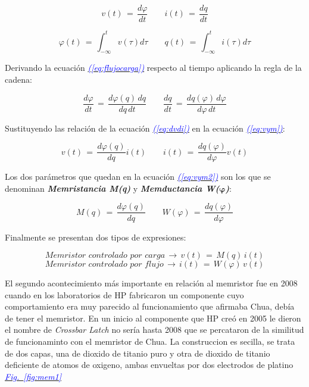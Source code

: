 \documentclass[12pt,a4paper]{report} %
\newcommand{\fref}[1]{\hyperref[#1]{\textcolor{blue}{\textit{Fig.~\ref*{#1}}}}}
\newcommand{\eref}[1]{\hyperref[#1]{\textcolor{blue}{\textit{(\ref*{#1})}}}}
\begin{document}
	\begin{equation}
		v(t)\,=\,\frac{d\varphi}{dt} \qquad i(t)\,=\,\frac{dq}{dt}
		\label{eq:dvdi}
	\end{equation}
			
	\begin{equation}
		\varphi(t)\,=\,\int_{-\infty}^{t}v(\tau)d\tau \qquad q(t)\,=\,\int_{-\infty}^{t}i(\tau)d\tau
		\label{eq:flujocargaintegral}
	\end{equation}\smallskip
	
	Derivando la ecuación \eref{eq:flujocarga} respecto al tiempo aplicando la regla de la cadena:
	
	\begin{equation}
		\frac{d\varphi}{dt}\,=\,\frac{d\varphi(q)\,dq}{dq\,dt} \qquad \frac{dq}{dt}\,=\,\frac{dq(\varphi)\,d\varphi}{d\varphi\,dt}
		\label{eq:vym}
	\end{equation}\smallskip
	
	Sustituyendo las relación de la ecuación \eref{eq:dvdi} en la ecuación \eref{eq:vym}:
	
	\begin{equation}
		v(t)\,=\,\frac{d\varphi(q)}{dq}i(t) \qquad i(t)\,=\,\frac{dq(\varphi)}{d\varphi}v(t)
		\label{eq:vym2}
	\end{equation}\smallskip
	
	Los dos parámetros que quedan en la ecuación \eref{eq:vym2} son los que se denominan \textbf{\textit{Memristancia M(q)}} y \textbf{\textit{Memductancia W($\bm{\varphi}$)}}: 
	
	\begin{equation}
		M(q)\,=\,\frac{d\varphi(q)}{dq} \qquad W(\varphi)\,=\,\frac{dq(\varphi)}{d\varphi}
		\label{eq:myw}
	\end{equation}\smallskip
	
	Finalmente se presentan dos tipos de expresiones:
	
	\begin{equation}
		\textit{Memristor controlado por carga} \, \rightarrow \, v(t)\,=\,M(q)\,i(t)
		\label{eq:cc}
	\end{equation}\smallskip
	\begin{equation}
		\textit{Memristor controlado por flujo} \, \rightarrow \, i(t)\,=\,W(\varphi)\,v(t)
		\label{eq:fc}
	\end{equation}\smallskip

	
	
	\newpage
	
	El segundo acontecimiento más importante en relación al memristor fue en 2008 cuando en los laboratorios de HP fabricaron un componente cuyo comportamiento era muy parecido al funcionamiento que afirmaba Chua, debía de tener el memristor. En un inicio al componente que HP creó en 2005 le dieron el nombre de \textit{Crossbar Latch} no sería hasta 2008 que se percataron de la similitud de funcionaminto con el memristor de Chua. La construccion es secilla, se trata de dos capas, una de dioxido de titanio puro y otra de dioxido de titanio deficiente de atomos de oxigeno, ambas envueltas por dos electrodos de platino \fref{fig:mem1}
	
\end{document}
